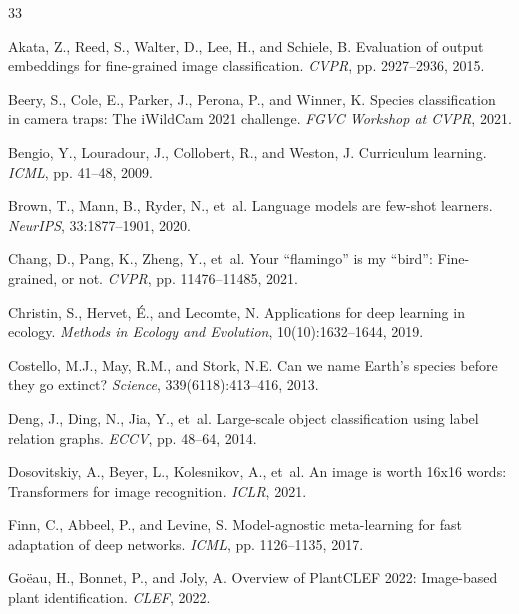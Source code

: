 \begin{thebibliography}{33}

Akata, Z., Reed, S., Walter, D., Lee, H., and Schiele, B.
\newblock Evaluation of output embeddings for fine-grained image classification.
\newblock \emph{CVPR}, pp. 2927--2936, 2015.

Beery, S., Cole, E., Parker, J., Perona, P., and Winner, K.
\newblock Species classification in camera traps: The iWildCam 2021 challenge.
\newblock \emph{FGVC Workshop at CVPR}, 2021.

Bengio, Y., Louradour, J., Collobert, R., and Weston, J.
\newblock Curriculum learning.
\newblock \emph{ICML}, pp. 41--48, 2009.

Brown, T., Mann, B., Ryder, N., et~al.
\newblock Language models are few-shot learners.
\newblock \emph{NeurIPS}, 33:1877--1901, 2020.

Chang, D., Pang, K., Zheng, Y., et~al.
\newblock Your ``flamingo'' is my ``bird'': Fine-grained, or not.
\newblock \emph{CVPR}, pp. 11476--11485, 2021.

Christin, S., Hervet, {\'E}., and Lecomte, N.
\newblock Applications for deep learning in ecology.
\newblock \emph{Methods in Ecology and Evolution}, 10(10):1632--1644, 2019.

Costello, M.J., May, R.M., and Stork, N.E.
\newblock Can we name Earth's species before they go extinct?
\newblock \emph{Science}, 339(6118):413--416, 2013.

Deng, J., Ding, N., Jia, Y., et~al.
\newblock Large-scale object classification using label relation graphs.
\newblock \emph{ECCV}, pp. 48--64, 2014.

Dosovitskiy, A., Beyer, L., Kolesnikov, A., et~al.
\newblock An image is worth 16x16 words: Transformers for image recognition.
\newblock \emph{ICLR}, 2021.

Finn, C., Abbeel, P., and Levine, S.
\newblock Model-agnostic meta-learning for fast adaptation of deep networks.
\newblock \emph{ICML}, pp. 1126--1135, 2017.

Go{\"e}au, H., Bonnet, P., and Joly, A.
\newblock Overview of PlantCLEF 2022: Image-based plant identification.
\newblock \emph{CLEF}, 2022.


\end{thebibliography}
